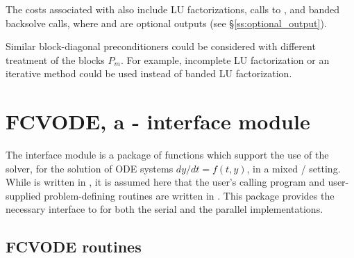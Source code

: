 The costs associated with {\cvbbdpre} also include  LU
factorizations,  calls to , and  banded
backsolve calls, where  and  are optional {\cvode}
outputs (see \S\ref{ss:optional_output}).

Similar block-diagonal preconditioners could be considered with different
treatment of the blocks $P_m$. For example, incomplete LU factorization or
an iterative method could be used instead of banded LU factorization.


\section{FCVODE, a {\F}-{\C} interface module}\label{ss:fcmix}

The {\fcvode} interface module is a package of {\C} functions which support
the use of the {\cvode} solver, for the solution of ODE systems 
$dy/dt = f(t,y)$, in a mixed {\F}/{\C} setting.  While {\cvode} is written
in {\C}, it is assumed here that the user's calling program and
user-supplied problem-defining routines are written in {\F}.
This package provides the necessary interface to {\cvode} for both the
serial and the parallel {\nvector} implementations.

\subsection{FCVODE routines}

